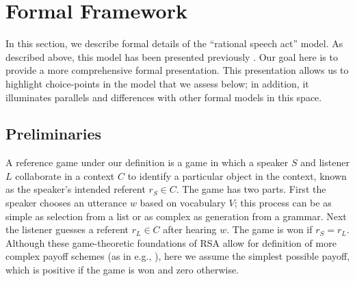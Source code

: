 \documentclass[man,noapacite]{apa2}
\newcounter{Experiment}
\newcommand{\expt}[1]{\protect\refstepcounter{Experiment}\arabic{Experiment}\label{#1}}
\begin{document}
\begin{table}
\begin{tabular}{cllllll}
\hline
\end{tabular}
\end{table}


\section{Formal Framework} \label{sec:models-intro}

In this section, we describe formal details of the ``rational speech act'' model. As described above, this model has been presented previously \cite{frank2012,goodman2013}. Our goal here is to provide a more comprehensive formal presentation. This presentation allows us to highlight choice-points in the model that we assess below; in addition, it illuminates parallels and differences with other formal models in this space.



\subsection{Preliminaries}

A reference game under our definition is a game in which a speaker $S$ and listener $L$ collaborate in a context $C$ to identify a particular object in the context, known as the speaker's intended referent $r_S \in C$. The game has two parts. First the speaker chooses an utterance $w$ based on vocabulary $V$; this process can be as simple as selection from a list or as complex as generation from a grammar. Next the listener guesses a referent $r_L \in C$ after hearing $w$. The game is won if $r_S=r_L$. Although these game-theoretic foundations of RSA allow for definition of more complex payoff schemes (as in e.g., ), here we assume the simplest possible payoff, which is positive if the game is won and zero otherwise.
\end{document}
